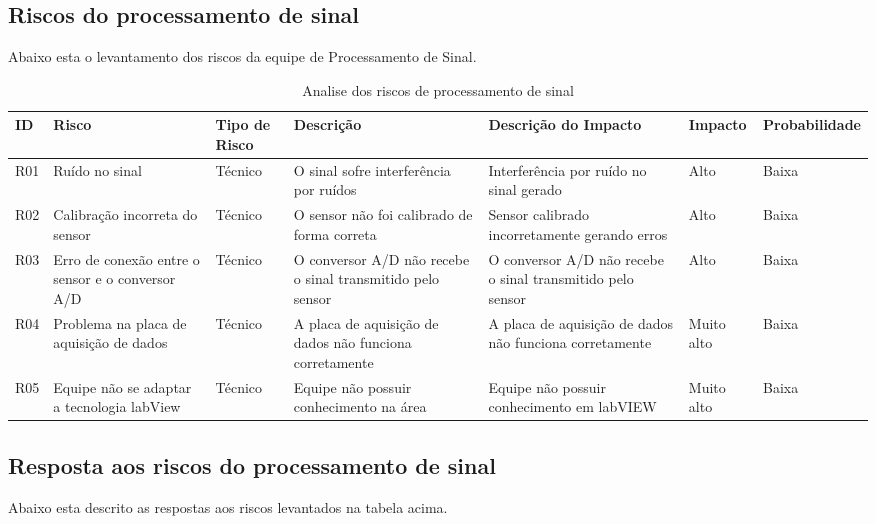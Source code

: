 \newpage\subsection{Riscos do processamento de sinal}
Abaixo esta o levantamento dos riscos da equipe de Processamento de Sinal.

\begin{table}[!htp]
    \centering
    \begin{tabular}{|p{1cm}|p{2cm}|p{2cm}|p{2cm}|p{2cm}|p{1.7cm}|p{2.9cm}|}
    \hline
    \textbf{ID}  & \textbf{Risco} & \textbf{Tipo de Risco} & \textbf{Descrição} & \textbf{Descrição do Impacto} & \textbf{Impacto} & \textbf{Probabilidade} \\ \hline
    R01 & Ruído no sinal & Técnico & O sinal sofre interferência por ruídos & Interferência por ruído no sinal gerado & Alto & Baixa \\ \hline
    R02 & Calibração incorreta do sensor & Técnico & O sensor não foi calibrado de forma correta & Sensor calibrado incorretamente gerando erros & Alto & Baixa \\ \hline 
    R03 &Erro de conexão entre o sensor e o conversor A/D &Técnico &O conversor A/D não recebe o sinal  transmitido pelo sensor &O conversor A/D não recebe o sinal  transmitido pelo sensor &Alto &Baixa \\ \hline
    R04 &Problema na placa de aquisição de dados &Técnico &A placa de aquisição de dados não funciona corretamente &A placa de aquisição de dados não funciona corretamente &Muito alto &Baixa \\ \hline
    R05 &Equipe não se adaptar a tecnologia labView &Técnico &Equipe não possuir conhecimento na área &Equipe não possuir conhecimento em labVIEW &Muito alto &Baixa \\ \hline
\end{tabular}
    \caption{Analise dos riscos de processamento de sinal}
    \end{table}

\newpage\subsection{Resposta aos riscos do processamento de sinal}
Abaixo esta descrito as respostas aos riscos levantados na tabela acima.

